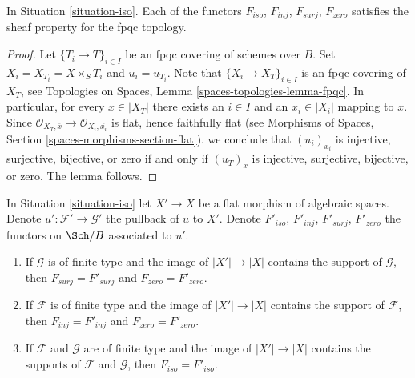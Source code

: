 \begin{lemma}
\label{lemma-iso-sheaf}
In Situation \ref{situation-iso}.
Each of the functors $F_{iso}$, $F_{inj}$, $F_{surj}$, $F_{zero}$
satisfies the sheaf property for the fpqc topology.
\end{lemma}

\begin{proof}
Let $\{T_i \to T\}_{i \in I}$ be an fpqc covering of schemes over $B$.
Set $X_i = X_{T_i} = X \times_S T_i$ and $u_i = u_{T_i}$.
Note that $\{X_i \to X_T\}_{i \in I}$ is an fpqc covering of $X_T$, see
Topologies on Spaces, Lemma \ref{spaces-topologies-lemma-fpqc}.
In particular, for every $x \in |X_T|$ there exists an $i \in I$
and an $x_i \in |X_i|$ mapping to $x$. Since
$\mathcal{O}_{X_T, \overline{x}} \to \mathcal{O}_{X_i, \overline{x_i}}$
is flat, hence faithfully flat (see 
Morphisms of Spaces, Section \ref{spaces-morphisms-section-flat}).
we conclude that $(u_i)_{x_i}$ is injective, surjective, bijective, or zero
if and only if $(u_T)_x$ is injective, surjective, bijective, or zero.
The lemma follows.
\end{proof}

\begin{lemma}
\label{lemma-iso-go-up}
In Situation \ref{situation-iso} let $X' \to X$ be a flat morphism
of algebraic spaces. Denote $u' : \mathcal{F}' \to \mathcal{G}'$
the pullback of $u$ to $X'$. Denote $F'_{iso}$, $F'_{inj}$, $F'_{surj}$,
$F'_{zero}$ the functors on $\Sch/B$ associated to $u'$.
\begin{enumerate}
\item If $\mathcal{G}$ is of finite type and the image of $|X'| \to |X|$
contains the support of $\mathcal{G}$, then $F_{surj} = F'_{surj}$
and $F_{zero} = F'_{zero}$.
\item If $\mathcal{F}$ is of finite type and the image of $|X'| \to |X|$
contains the support of $\mathcal{F}$, then $F_{inj} = F'_{inj}$
and $F_{zero} = F'_{zero}$.
\item If $\mathcal{F}$ and $\mathcal{G}$ are of finite type and the image of
$|X'| \to |X|$ contains the supports of $\mathcal{F}$ and $\mathcal{G}$,
then $F_{iso} = F'_{iso}$.
\end{enumerate}
\end{lemma}


